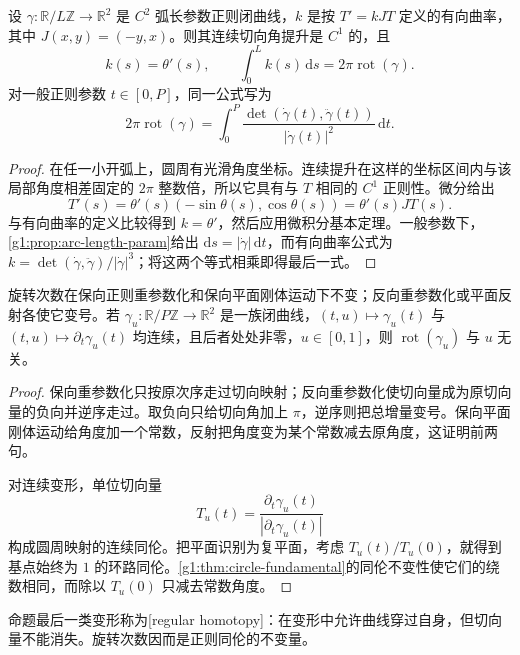 \begin{proposition}\label{g1:prop:total-turning}
	设 \(\gamma:\mathbb R/L\mathbb Z\rightarrow\mathbb R^2\) 是 \(C^2\) 弧长参数正则闭曲线，\(k\) 是按 \(T'=kJT\) 定义的有向曲率，其中 \(J(x,y)=(-y,x)\)。则其连续切向角提升是 \(C^1\) 的，且
	\begin{equation}\label{g1:eq:total-signed-curvature}
		k(s)=\theta'(s),\qquad \int_0^L k(s)\,\mathrm{d}s=2\pi\operatorname{rot}(\gamma).
	\end{equation}
	对一般正则参数 \(t\in[0,P]\)，同一公式写为
	\[
		2\pi\operatorname{rot}(\gamma)
		=\int_0^P\frac{\det(\dot\gamma(t),\ddot\gamma(t))}{|\dot\gamma(t)|^2}\,\mathrm{d}t.
	\]
\end{proposition}
\begin{proof}
	在任一小开弧上，圆周有光滑角度坐标。连续提升在这样的坐标区间内与该局部角度相差固定的 \(2\pi\) 整数倍，所以它具有与 \(T\) 相同的 \(C^1\) 正则性。微分给出
	\[
		T'(s)=\theta'(s)(-\sin\theta(s),\cos\theta(s))=\theta'(s)JT(s).
	\]
	与有向曲率的定义比较得到 \(k=\theta'\)，然后应用微积分基本定理。一般参数下，\cref{g1:prop:arc-length-param}给出 \(\mathrm{d}s=|\dot\gamma|\,\mathrm{d}t\)，而有向曲率公式为 \(k=\det(\dot\gamma,\ddot\gamma)/|\dot\gamma|^3\)；将这两个等式相乘即得最后一式。
\end{proof}

\begin{proposition}\label{g1:prop:rotation-invariance}
	旋转次数在保向正则重参数化和保向平面刚体运动下不变；反向重参数化或平面反射各使它变号。若 \(\gamma_u:\mathbb R/P\mathbb Z\rightarrow\mathbb R^2\) 是一族闭曲线，\((t,u)\mapsto\gamma_u(t)\) 与 \((t,u)\mapsto\partial_t\gamma_u(t)\) 均连续，且后者处处非零，\(u\in[0,1]\)，则 \(\operatorname{rot}(\gamma_u)\) 与 \(u\) 无关。
\end{proposition}
\begin{proof}
	保向重参数化只按原次序走过切向映射；反向重参数化使切向量成为原切向量的负向并逆序走过。取负向只给切向角加上 \(\pi\)，逆序则把总增量变号。保向平面刚体运动给角度加一个常数，反射把角度变为某个常数减去原角度，这证明前两句。

	对连续变形，单位切向量
	\[
		T_u(t)=\frac{\partial_t\gamma_u(t)}{|\partial_t\gamma_u(t)|}
	\]
	构成圆周映射的连续同伦。把平面识别为复平面，考虑 \(T_u(t)/T_u(0)\)，就得到基点始终为 \(1\) 的环路同伦。\cref{g1:thm:circle-fundamental}的同伦不变性使它们的绕数相同，而除以 \(T_u(0)\) 只减去常数角度。
\end{proof}

命题最后一类变形称为[regular homotopy]：在变形中允许曲线穿过自身，但切向量不能消失。旋转次数因而是正则同伦的不变量。

